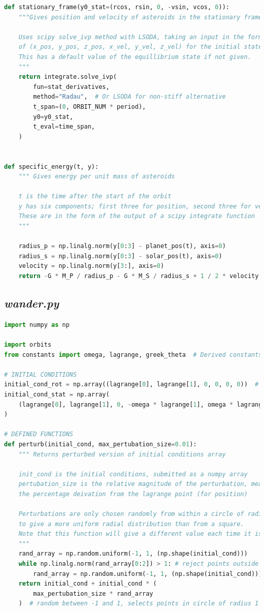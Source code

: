 \documentclass[11pt, a4paper,twocolumn]{article} %
\begin{document}
\begin{appendices}
\begin{lstlisting}[language=Python]
def stationary_frame(y0_stat=(rcos, rsin, 0, -vsin, vcos, 0)):
	"""Gives position and velocity of asteroids in the stationary frame
	
	Uses scipy solve_ivp method with LSODA, taking an input in the form
	of (x_pos, y_pos, z_pos, x_vel, y_vel, z_vel) for the initial state.
	This has a default value of the equillibrium state if not given.
	"""
	return integrate.solve_ivp(
		fun=stat_derivatives,
		method="Radau",  # Or LSODA for non-stiff alternative
		t_span=(0, ORBIT_NUM * period),
		y0=y0_stat,
		t_eval=time_span,
	)


def specific_energy(t, y):
	""" Gives energy per unit mass of asteroids
	
	t is the time after the start of the orbit
	y has six components; first three for position, second three for velocity
	These are in the form of the output of a scipy integrate function
	"""
	
	radius_p = np.linalg.norm(y[0:3] - planet_pos(t), axis=0)
	radius_s = np.linalg.norm(y[0:3] - solar_pos(t), axis=0)
	velocity = np.linalg.norm(y[3:], axis=0)
	return -G * M_P / radius_p - G * M_S / radius_s + 1 / 2 * velocity ** 2

\end{lstlisting}
\bigskip

\subsection{\textit{wander.py}}
\begin{lstlisting}[language=Python]
import numpy as np

import orbits
from constants import omega, lagrange, greek_theta  # Derived constants

# INITIAL CONDITIONS
initial_cond_rot = np.array((lagrange[0], lagrange[1], 0, 0, 0, 0))  # in rotating frame
initial_cond_stat = np.array(
	(lagrange[0], lagrange[1], 0, -omega * lagrange[1], omega * lagrange[0], 0)
)

# DEFINED FUNCTIONS
def perturb(initial_cond, max_pertubation_size=0.01):
	""" Returns perturbed version of initial conditions array
	
	init_cond is the initial conditions, submitted as a numpy array
	pertubation_size is the relative magnitude of the perturbation, measured as 
	the percentage deivation from the lagrange point (for position)
	
	Perturbations are only chosen randomly from within a circle of radius one, 
	to give a more uniform radial distribution than from a square.
	Note that this function will give a different value each time it is run
	"""
	rand_array = np.random.uniform(-1, 1, (np.shape(initial_cond)))
	while np.linalg.norm(rand_array[0:2]) > 1: # reject points outside circle
		rand_array = np.random.uniform(-1, 1, (np.shape(initial_cond)))
	return initial_cond + initial_cond * (
		max_pertubation_size * rand_array	
	)  # random between -1 and 1, selects points in circle of radius 1



\end{lstlisting}
\end{appendices}
\end{document}
